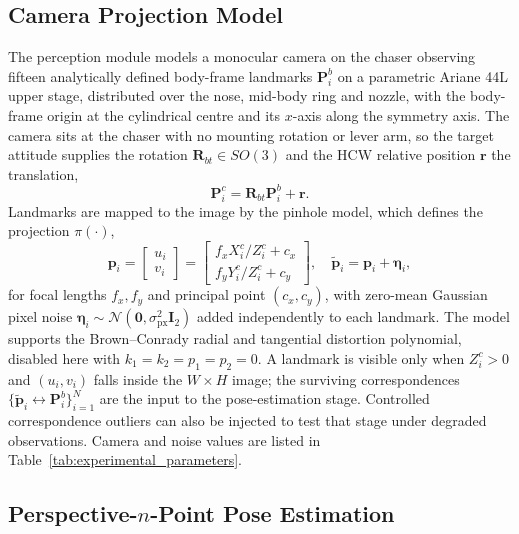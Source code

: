 \subsection{Camera Projection Model}

The perception module models a monocular camera on the chaser observing
fifteen analytically defined body-frame landmarks $\mathbf{P}_i^{b}$ on a
parametric Ariane 44L upper stage, distributed over the nose, mid-body ring
and nozzle, with the body-frame origin at the cylindrical centre and its
$x$-axis along the symmetry axis. The camera sits at the chaser with no
mounting rotation or lever arm, so the target attitude supplies the rotation
$\mathbf{R}_{bt}\in SO(3)$ and the HCW relative position $\mathbf{r}$ the
translation,
\begin{equation}
    \mathbf{P}_i^{c} = \mathbf{R}_{bt}\mathbf{P}_i^{b} + \mathbf{r}.
\end{equation}
Landmarks are mapped to the image by the pinhole model, which defines the
projection $\pi(\cdot)$,
\begin{equation}
    \mathbf{p}_i
    =
    \begin{bmatrix} u_i \\ v_i \end{bmatrix}
    =
    \begin{bmatrix}
        f_x X_i^c/Z_i^c + c_x \\ f_y Y_i^c/Z_i^c + c_y
    \end{bmatrix},
    \quad
    \tilde{\mathbf{p}}_i = \mathbf{p}_i + \boldsymbol{\eta}_i,
\end{equation}
for focal lengths $f_x,f_y$ and principal point $(c_x,c_y)$, with zero-mean
Gaussian pixel noise
$\boldsymbol{\eta}_i\sim\mathcal{N}(\mathbf{0},\sigma_{\mathrm{px}}^2\mathbf{I}_2)$
added independently to each landmark. The model supports the Brown--Conrady
radial and tangential distortion polynomial, disabled here with
$k_1=k_2=p_1=p_2=0$. A landmark is visible only when
$Z_i^c>0$ and $(u_i,v_i)$ falls inside the $W\times H$ image; the surviving
correspondences $\{\tilde{\mathbf{p}}_i \leftrightarrow
\mathbf{P}_i^b\}_{i=1}^{N}$ are the input to the pose-estimation stage.
Controlled correspondence outliers can also be injected to test that stage
under degraded observations. Camera and noise values are listed in
Table~\ref{tab:experimental_parameters}.

\subsection{Perspective-$n$-Point Pose Estimation}

